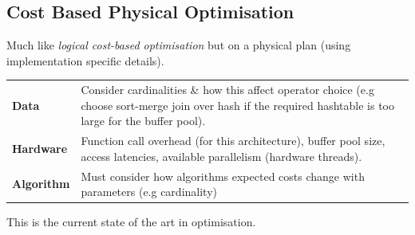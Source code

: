 \subsection{Cost Based Physical Optimisation}
Much like \textit{logical cost-based optimisation} but on a physical plan (using implementation specific details).
\begin{center}
    \begin{tabular}{l p{}}
        \textbf{Data}      & Consider cardinalities \& how this affect operator choice (e.g choose sort-merge join over hash if the required hashtable is too large for the buffer pool). \\
        \textbf{Hardware}  & Function call overhead (for this architecture), buffer pool size, access latencies, available parallelism (hardware threads).                                \\
        \textbf{Algorithm} & Must consider how algorithms expected costs change with parameters (e.g cardinality)                                                                         \\
    \end{tabular}
\end{center}
This is the current state of the art in optimisation.

